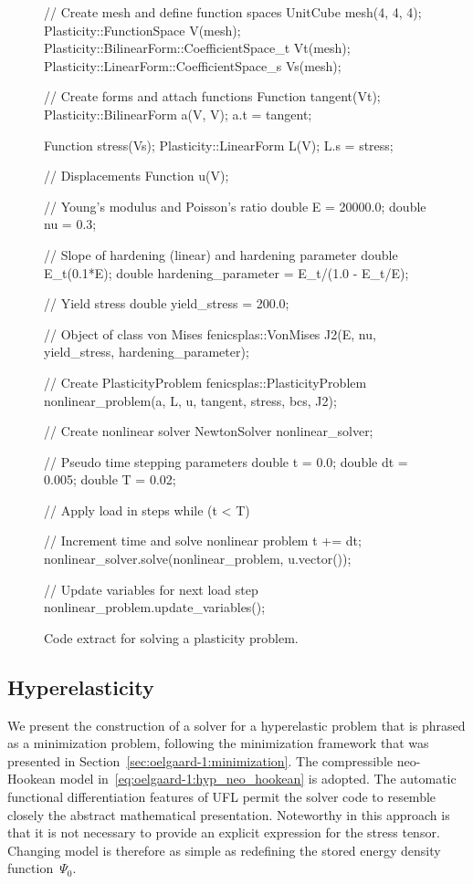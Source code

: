 \begin{figure}
\begin{c++}
// Create mesh and define function spaces
UnitCube mesh(4, 4, 4);
Plasticity::FunctionSpace V(mesh);
Plasticity::BilinearForm::CoefficientSpace_t Vt(mesh);
Plasticity::LinearForm::CoefficientSpace_s Vs(mesh);

// Create forms and attach functions
Function tangent(Vt);
Plasticity::BilinearForm a(V, V);
a.t = tangent;

Function stress(Vs);
Plasticity::LinearForm L(V);
L.s = stress;

// Displacements
Function u(V);

// Young's modulus and Poisson's ratio
double E = 20000.0; double nu = 0.3;

// Slope of hardening (linear) and hardening parameter
double E_t(0.1*E);
double hardening_parameter = E_t/(1.0 - E_t/E);

// Yield stress
double yield_stress = 200.0;

// Object of class von Mises
fenicsplas::VonMises J2(E, nu, yield_stress, hardening_parameter);

// Create PlasticityProblem
fenicsplas::PlasticityProblem nonlinear_problem(a, L, u, tangent, stress, bcs, J2);

// Create nonlinear solver
NewtonSolver nonlinear_solver;

// Pseudo time stepping parameters
double t = 0.0; double dt  = 0.005; double T = 0.02;

// Apply load in steps
while (t < T)
{
  // Increment time and solve nonlinear problem
  t += dt;
  nonlinear_solver.solve(nonlinear_problem, u.vector());

  // Update variables for next load step
  nonlinear_problem.update_variables();
}
\end{c++}
\caption{Code extract for solving a plasticity problem.}
\label{fig:oelgaard-1:plas_cpp_code}
\end{figure}

\subsection{Hyperelasticity}
\label{sec:oelgaard-1:examples_hyp_elas}

We present the construction of a solver for a hyperelastic problem that is
phrased as a minimization problem, following the minimization framework
that was presented in Section~\ref{sec:oelgaard-1:minimization}. The
compressible neo-Hookean model in~\eqref{eq:oelgaard-1:hyp_neo_hookean}
is adopted.  The automatic functional differentiation features of UFL
permit the solver code to resemble closely the abstract mathematical
presentation. Noteworthy in this approach is that it is not necessary to
provide an explicit expression for the stress tensor.  Changing model is
therefore as simple as redefining the stored energy density function~$\Psi_{0}$.

